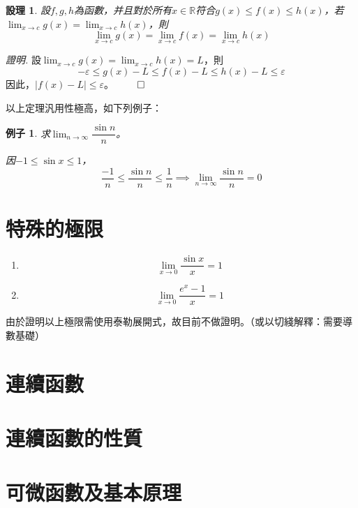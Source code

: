 \documentclass[12pt]{article}
\newtheorem*{proposition}{設理}
\newtheorem*{example}{例子}
\renewenvironment*{proof}{\textit{證明.}}{\hfill$\qed$}
\begin{document}
    \begin{proposition}
        設$f,g,h$為函數，并且對於所有$x\in\mathbb{R}$符合$g(x)\leq f(x)\leq h(x)$，若$\displaystyle \lim_{x\to c}g(x)=\lim_{x\to c}h(x)$，則$$\lim_{x\to c}g(x)=\lim_{x\to c}f(x)=\lim_{x\to c}h(x)$$
    \end{proposition}

    \begin{proof}
        設$\displaystyle \lim_{x\to c}g(x)=\lim_{x\to c}h(x)=L$，則$$-\varepsilon\leq g(x)-L\leq f(x)-L\leq h(x)-L\leq \varepsilon$$
        因此，$|f(x)-L|\leq \varepsilon$。
    \end{proof}

    以上定理汎用性極高，如下列例子：
    
    \begin{example}
        求$\lim_{n\to \infty}\dfrac{\sin{n}}{n}$。

        因$-1\leq \sin{x}\leq 1$，$$\frac{-1}{n}\leq \frac{\sin{n}}{n}\leq \frac{1}{n}\implies \lim_{n\to\infty}\frac{\sin{n}}{n}=0$$
    \end{example}
    \section*{特殊的極限}
    \begin{enumerate}
        \item $$\lim_{x\to 0}\frac{\sin{x}}{x}=1$$
        \item $$\lim_{x\to 0}\frac{e^{x}-1}{x}=1$$
    \end{enumerate}

    由於證明以上極限需使用泰勒展開式，故目前不做證明。（或以切綫解釋：需要導數基礎）
    \section*{連續函數}
    \section*{連續函數的性質}
    \section*{可微函數及基本原理}
\end{document}
